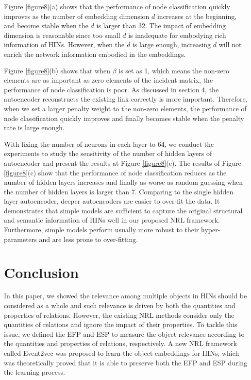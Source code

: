 Figure \ref{figure8}(a) shows that the performance of node classification quickly improves as the number of embedding dimension $d$ increases at the beginning, and become stable when the $d$ is larger than 32. The impact of embedding dimension is reasonable since too small $d$ is inadequate for embodying rich information of HINs. However, when the $d$ is large enough, increasing $d$ will not enrich the network information embodied in the embeddings.

Figure \ref{figure8}(b) shows that when $\beta$ is set as 1, which means the non-zero elements are as important as zero elements of the incident matrix, the performance of node classification is poor. As discussed in section 4, the autoencoder reconstructs the existing link correctly is more important. Therefore, when we set a larger penalty weight to the non-zero elements, the performance of node classification quickly improves and finally becomes stable when the penalty rate is large enough.

With fixing the number of neurons in each layer to 64, we conduct the experiments to study the sensitivity of the number of hidden layers of autoencoder and present the results at Figure \ref{figure8}(c). The results of Figure \ref{figure8}(c) show that the performance of node classification reduces as the number of hidden layers increases and finally as worse as random guessing when the number of hidden layers is larger than 7. Comparing to the single hidden layer autoencoder, deeper autoencoders are easier to over-fit the data. It demonstrates that simple models are sufficient to capture the original structural and semantic information of HINs well in our proposed NRL framework. Furthermore, simple models perform usually more robust to their hyper-parameters and are less prone to over-fitting.

\section{Conclusion}
In this paper, we showed the relevance among multiple objects in HINs should be considered as a whole and such relevance is driven by both the quantities and properties of relations. However, the existing NRL methods consider only the quantities of relations and ignore the impact of their properties. To tackle this issue, we defined the EFP and ESP to measure the object relevance according to the quantities and properties of relations, respectively. A new NRL framework called Event2vec was proposed to learn the object embeddings for HINs, which was theoretically proved that it is able to preserve both the EFP and ESP during the learning process.

